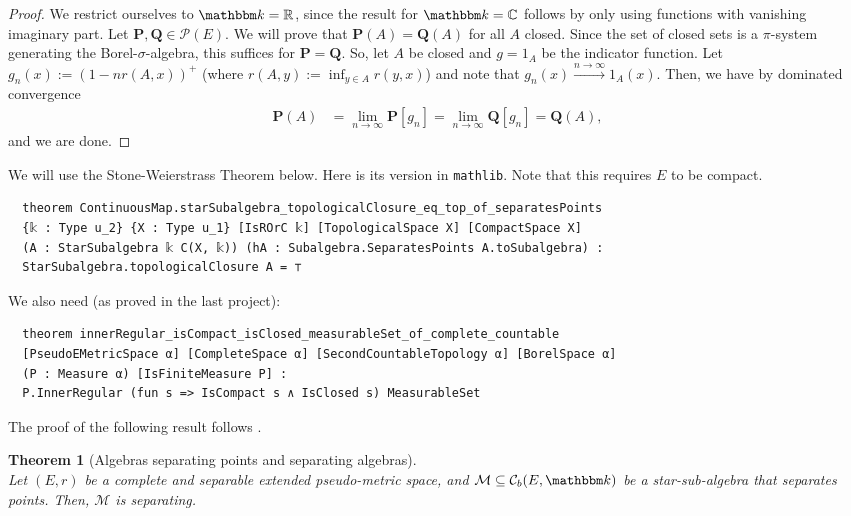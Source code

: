 \documentclass{article}
\newtheorem{theorem}{Theorem}
\theoremstyle{definition}
\theoremstyle{step} \newtheorem{step}{Step}
\newcommand{\leanline}[1]{\texttt{#1}}%
\begin{document}
\begin{proof}
  We restrict ourselves to $\mathbbm k = \mathbb R$, since the result
  for $\mathbbm k = \mathbb C$ follows by only using functions with
  vanishing imaginary part. Let $\mathbf P, \mathbf Q \in \mathcal
  P(E)$. We will prove that $\mathbf P(A) = \mathbf Q(A)$ for all $A$
  closed. Since the set of closed sets is a $\pi$-system generating
  the Borel-$\sigma$-algebra, this suffices for $\mathbf P = \mathbf
  Q$. So, let $A$ be closed and $g = 1_A$ be the indicator
  function. Let $g_n(x) := (1 - n r(A,x))^+$ (where $r(A,y) := \inf_{y\in
    A}r(y,x)$) and note that $g_n(x) \xrightarrow{n\to\infty}
  1_A(x)$. Then, we have by dominated convergence
  \begin{align*}
    \mathbf P(A) & = \lim_{n\to\infty} \mathbf P[g_n] =
    \lim_{n\to\infty} \mathbf Q[g_n] = \mathbf Q(A),
  \end{align*}
  and we are done.
\end{proof}

We will use the Stone-Weierstrass Theorem below. Here is its version
in \leanline{mathlib}. Note that this requires $E$ to be compact. 

\begin{verbatim}
  theorem ContinuousMap.starSubalgebra_topologicalClosure_eq_top_of_separatesPoints
  {𝕜 : Type u_2} {X : Type u_1} [IsROrC 𝕜] [TopologicalSpace X] [CompactSpace X]
  (A : StarSubalgebra 𝕜 C(X, 𝕜)) (hA : Subalgebra.SeparatesPoints A.toSubalgebra) :
  StarSubalgebra.topologicalClosure A = ⊤
\end{verbatim}

We also need (as proved in the last project):

\begin{verbatim}
  theorem innerRegular_isCompact_isClosed_measurableSet_of_complete_countable
  [PseudoEMetricSpace α] [CompleteSpace α] [SecondCountableTopology α] [BorelSpace α]
  (P : Measure α) [IsFiniteMeasure P] :
  P.InnerRegular (fun s => IsCompact s ∧ IsClosed s) MeasurableSet
\end{verbatim}

The proof of the following result follows
\cite[Theorem~3.4.5]{EthierKurtz1986}.

\begin{theorem}[Algebras separating points and separating algebras]
  \label{T:wc3}\mbox{}\\ \sloppy Let $(E,r)$ be a complete and separable extended pseudo-metric space, and
  $\mathcal M \subseteq\mathcal C_b(E,\mathbbm k)$ be a
  star-sub-algebra that separates points. Then, $\mathcal M$ is
  separating.
\end{theorem}
\end{document}
